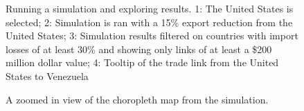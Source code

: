 \begin{figure}[htb]
	\caption[RUNNING A SIMULATION AND EXPLORING RESULTS]{Running a simulation and exploring results. 1: {The United States is selected}; 2: {Simulation is ran with a 15\% export reduction from the United States}; 3: {Simulation results filtered on countries with import losses of at least 30\% and showing only links of at least a \$200 million dollar value}; 4: {Tooltip of the trade link from the United States to Venezuela} }
	\label{cs2-1}
\end{figure}
\begin{figure}[htb]
	\caption[SIMULATION CHOROPLETH MAP]{A zoomed in view of the choropleth map from the simulation.}
	\label{cs2-2}
\end{figure}
